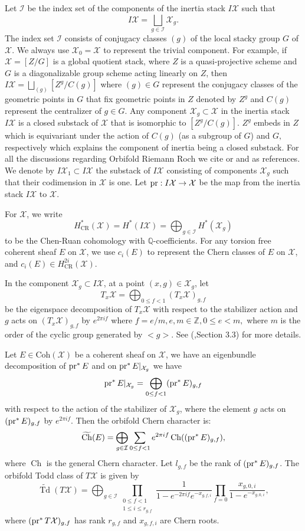 \documentclass[10pt]{amsart}
\newcommand{\qq}{{\mathbb Q}}
\newcommand{\sI}{{\mathcal I}}
\newcommand{\sX}{{\mathcal X}}
\newcommand{\Coh}{\mbox{Coh}}
\DeclareMathOperator{\Ch}{Ch}
\DeclareMathOperator{\CR}{CR}
\DeclareMathOperator{\Td}{Td}
\newcommand{\pr}{\mathop{\rm pr}\nolimits}
\numberwithin{equation}{subsection}
\begin{document}
Let $\sI$ be the index set of the components of the inertia stack 
$I\sX$ such that
$$I\sX=\bigsqcup_{g\in\sI}\sX_g.$$
The index set $\sI$ consists of conjugacy classes $(g)$ of the local stacky group $G$ of $\sX$. 
We always use $\sX_0=\sX$ to represent the trivial component.  For example, if $\sX=[Z/G]$ is a global  quotient stack, where $Z$ is a quasi-projective scheme and $G$ is a diagonalizable group scheme acting linearly on $Z$, then 
$I\sX=\bigsqcup_{(g)}[Z^g/C(g)]$ where $(g)\in G$ represent the conjugacy classes of the geometric points in $G$ that fix geometric points in $Z$ denoted by $Z^g$ and $C(g)$ represent the centralizer of $g\in G$. Any component $\sX_g\subset \sX$ in the inertia stack $I\sX$ is a closed substack of $\sX$ that is isomorphic to $[Z^g/C(g)]$. $Z^g$ embeds in $Z$ which is equivariant under the action of $C(g)$ (as a subgroup of $G$)  and $G,$ respectively which explains the component of inertia being a closed substack.
For all the discussions regarding Orbifold Riemann Roch we cite \cite[\S 3.3]{Nir}  or \cite{Toe} and \cite{Tse} as references.
We denote by $I\sX_1\subset I\sX$  the substack of $I\sX$ consisting of components $\sX_g$ such that their codimension in $\sX$ is one. 
Let $\pr: I\sX\to \sX$ be the map from the inertia stack $I\sX$ to $\sX$. 

For $\sX$, we write 
$$H_{\CR}^*(\sX)=H^*(I\sX)=\bigoplus_{g\in\sI}H^*(\sX_g)$$
to be the Chen-Ruan cohomology with $\qq$-coefficients. For any torsion free coherent sheaf $E$ on $\sX$, we use $c_i(E)$ to represent the Chern classes of $E$ on $\sX$, and $c_i(E)\in H^{2i}_{\CR}(\sX)$. 

In the component $\sX_g\subset I\sX$, at a point $(x,g)\in \sX_g$, let 
$$T_{x}\sX=\bigoplus_{0\leq f<1}\left(T_{x}\sX\right)_{g,f}$$
be the eigenspace decomposition of $T_{x}\sX$ with respect to the stabilizer action and $g$ acts on $\left(T_{x}\sX\right)_{g,f}$ by $e^{2\pi i f}$ where $f=e/m,e,m\in \mathbb Z, 0\leq e<m,$ where $m$ is the order of the cyclic group generated by $<g>.$ See (\cite{Nir},Section 3.3) for more details.

Let $E\in\Coh(\sX)$ be a coherent sheaf on $\sX$, we have an eigenbundle decomposition of $\pr^*E $ and on $\pr^*E|_{\sX_g}$ we have
$$\pr^*E|_{\sX_g}=\bigoplus_{0\leq f<1}(\pr^*E)_{g,f}$$
with respect to the action of the stabilizer of $\sX_g$, where the element $g$ acts on $(\pr^*E)_{g,f}$ by $e^{2\pi i f}$.  
Then the orbifold Chern character is:
\begin{equation}\label{eqn_chern}
\widetilde{\Ch}(E)=\bigoplus_{g\in \sI}\sum_{0\leq f<1}e^{2\pi i f}\Ch((\pr^*E)_{g,f}),
\end{equation}
where $\Ch$ is the general Chern character.  Let $l_{g,f}$ be the rank of $(\pr^*E)_{g,f}$.   The orbifold Todd class of $T\sX$ is given by 
\begin{equation}\label{Todd}
\widetilde{\Td}(T\sX)=\bigoplus_{g\in \sI}\prod_{\substack{0\leq f<1\\
1\leq i\leq r_{g,f}}}\frac{1}{1-e^{-2\pi i f}e^{-x_{g,f,i}}}\prod_{f=0}\frac{x_{g,0,i}}{1-e^{-x_{g,0,i}}},
\end{equation}
where $(\pr^*T\sX)_{g,f}$ has rank $r_{g,f}$ and $x_{g,f,i}$ are Chern roots. 
\end{document}
